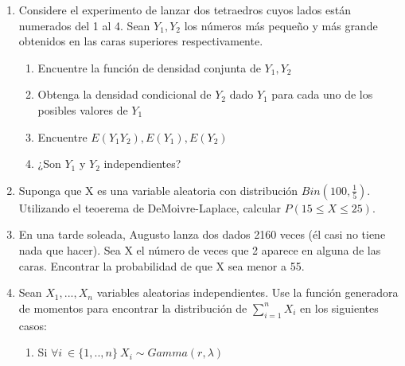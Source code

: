 \documentclass[11pt,a4paper]{report}
\begin{document}
	\begin{enumerate}
		\item{
		
		Considere el experimento de lanzar dos tetraedros cuyos lados están numerados del 1 al 4. Sean $Y_{1},Y_{2}$ los números más pequeño y más grande obtenidos en las caras superiores respectivamente. 
		    
		    \begin{enumerate}
		        \item {Encuentre la función de densidad conjunta de $Y_{1},Y_{2}$}
		        \item{Obtenga la densidad condicional de $Y_{2}$ dado $Y_{1}$ para cada uno de los posibles valores de $Y_{1}$}
		        \item{Encuentre $E(Y_{1}Y_{2}),E(Y_{1}),E(Y_{2})$}
		        \item{¿Son $Y_{1} $ y $Y_{2}$ independientes?}
		    \end{enumerate}
            
		}

		\item{
		Suponga que X es una variable aleatoria con distribución $Bin(100,\frac{1}{5})$. Utilizando el teoerema de DeMoivre-Laplace, calcular $P(15\leq X \leq 25)$. 
		
		}

		\item{
            En una tarde soleada, Augusto lanza dos dados 2160 veces (él casi no tiene nada que hacer). Sea X el número de veces que 2 aparece en alguna de las caras. Encontrar la probabilidad de que X sea menor a 55.
		}

		\item{
			Sean $X_{1},...,X_{n}$ variables aleatorias independientes. Use la función generadora de momentos para encontrar la distribución de $\sum_{i=1}^{n}X_{i}$ en los siguientes casos:\\
			\begin{enumerate}
			    \item {Si $\forall i \ \in \lbrace 1,..,n \rbrace \ X_{i} \sim Gamma(r,\lambda)$}
			    

\end{enumerate}}
\end{enumerate}
\end{document}
